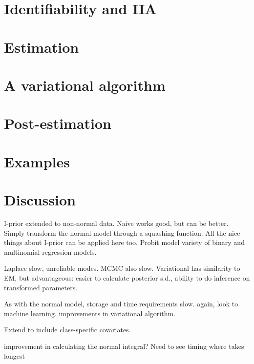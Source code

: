 \documentclass[a4paper,showframe,11pt]{report}
\begin{document}
\section{Identifiability and IIA}\label{sec:iia}
%

\section{Estimation}
%

\section{A variational algorithm}\label{sec:iprobitvar}


\section{Post-estimation}
%

\section{Examples}

\section{Discussion}

I-prior extended to non-normal data. 
Naive works good, but can be better.
Simply transform the normal model through a squashing function.
All the nice things about I-prior can be applied here too.
Probit model variety of binary and multinomial regression models.

Laplace slow, unreliable modes. MCMC also slow. Variational has similarity to EM, but advantageous: easier to calculate posterior s.d., ability to do inference on transformed parameters.

As with the normal model, storage and time requirements slow.
again, look to machine learning.
improvements in variational algorithm.

Extend to include class-specific covariates.

improvement in calculating the normal integral?
Need to see timing where takes longest
\end{document}
